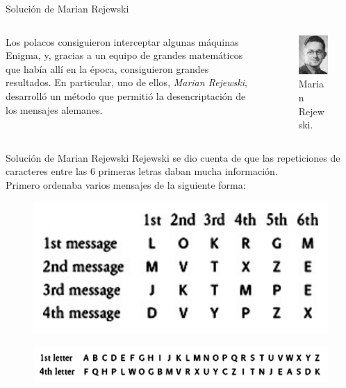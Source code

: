 \documentclass[aspectratio=169]{beamer}
\begin{document}
\begin{frame}{Solución de Marian Rejewski}
\begin{columns}
    \begin{column}{0.5\textwidth}
        Los polacos consiguieron interceptar algunas máquinas Enigma, y, gracias a un equipo de grandes matemáticos que había allí en la época, consiguieron grandes resultados. En particular, uno de ellos, \textit{Marian Rejewski}, desarrolló un método que permitió la desencriptación de los mensajes alemanes.

    \end{column}
    \begin{column}{0.5\textwidth}
        \begin{figure}
            \centering
            \includegraphics[width=0.5\linewidth]{pic/Rejewski.png}
            \caption{Marian Rejewski.}
        \end{figure}
    \end{column}
\end{columns}
\end{frame}

\begin{frame}{Solución de Marian Rejewski}
Rejewski se dio cuenta de que las repeticiones de caracteres entre las 6 primeras letras daban mucha información.\pause \\  
Primero ordenaba varios mensajes de la siguiente forma:
\begin{figure}
    \centering
    \includegraphics[width=0.5\linewidth]{pic/ordenacion1.png}
\end{figure}

\begin{figure}
    \centering
    \includegraphics[width=0.75\linewidth]{pic/ordenacion2.png}
\end{figure}
    
\end{frame}
\end{document}
